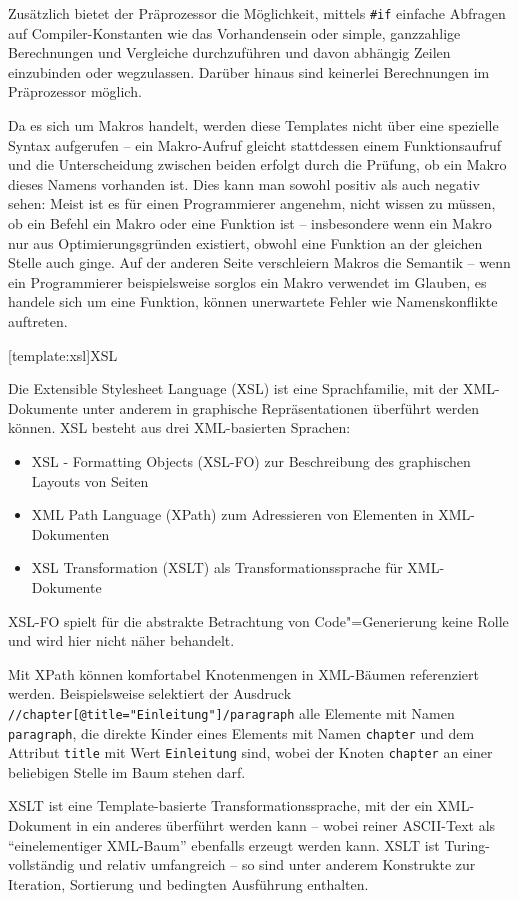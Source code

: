 \documentclass[12pt, a4paper, bibgerm]{scrbook}
\newcommand\icode[1]{\lstinline?#1?}
\newcommand\lsection{}
\newcommand{\cgen}{Code"=Generierung}
\begin{document}
Zusätzlich bietet der Präprozessor die Möglichkeit, mittels \icode{#if}
einfache Abfragen auf Compiler-Konstanten wie das Vorhandensein oder
simple, ganzzahlige Berechnungen und Vergleiche durchzuführen und davon
abhängig Zeilen einzubinden oder wegzulassen. Darüber hinaus sind
keinerlei Berechnungen im Präprozessor möglich.

Da es sich um Makros handelt, werden diese Templates nicht über eine
spezielle Syntax aufgerufen -- ein Makro-Aufruf gleicht stattdessen
einem Funktionsaufruf und die Unterscheidung zwischen beiden erfolgt
durch die Prüfung, ob ein Makro dieses Namens vorhanden ist. Dies kann
man sowohl positiv als auch negativ sehen: Meist ist es für einen
Programmierer angenehm, nicht wissen zu müssen, ob ein Befehl ein Makro
oder eine Funktion ist -- insbesondere wenn ein Makro nur aus
Optimierungsgründen existiert, obwohl eine Funktion an der gleichen
Stelle auch ginge. Auf der anderen Seite verschleiern Makros die
Semantik -- wenn ein Programmierer beispielsweise sorglos ein Makro
verwendet im Glauben, es handele sich um eine Funktion, können
unerwartete Fehler wie Namenskonflikte auftreten.

\lsection[template:xsl]{XSL}

Die Extensible Stylesheet Language (XSL) \cite{XSLT} ist eine
Sprachfamilie, mit der XML-Dokumente unter anderem in graphische
Repräsentationen überführt werden können. XSL besteht aus drei
XML-basierten Sprachen:
\begin{itemize}
\item XSL - Formatting Objects (XSL-FO) zur Beschreibung des graphischen Layouts von Seiten
\item XML Path Language (XPath) zum Adressieren von Elementen in XML-Dokumenten
\item XSL Transformation (XSLT) als Transformationssprache für XML-Dokumente
\end{itemize}
XSL-FO spielt für die abstrakte Betrachtung von \cgen{} keine Rolle und
wird hier nicht näher behandelt.

Mit XPath können komfortabel Knotenmengen in XML-Bäumen referenziert
werden. Beispielsweise selektiert der Ausdruck
\icode{//chapter[@title="Einleitung"]/paragraph} alle Elemente mit Namen
\icode{paragraph}, die direkte Kinder eines Elements mit Namen
\icode{chapter} und dem Attribut \icode{title} mit Wert
\icode{Einleitung} sind, wobei der Knoten \icode{chapter} an einer
beliebigen Stelle im Baum stehen darf.

XSLT ist eine Template-basierte Transformationssprache, mit der ein
XML-Dokument in ein anderes überführt werden kann -- wobei reiner
ASCII-Text als ``einelementiger XML-Baum'' ebenfalls erzeugt werden
kann. XSLT ist Turing-vollständig und relativ umfangreich -- so sind
unter anderem Konstrukte zur Iteration, Sortierung und bedingten
Ausführung enthalten. 
\end{document}
